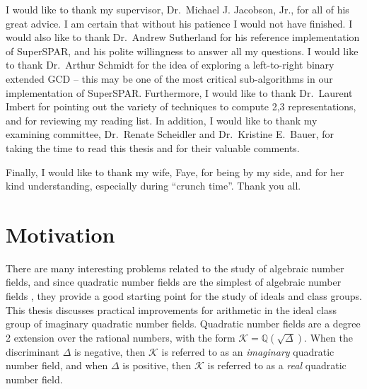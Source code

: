 \documentclass{ucalgthes1}
\theoremstyle{definition}
\newcommand{\QQ}{\mathbb{Q}}
\newcommand{\KK}{\mathcal{K}}
\begin{document}
\newpage
{}
{}

I would like to thank my supervisor, Dr.\ Michael J. Jacobson, Jr., for all of his great advice.  I am certain that without his patience I would not have finished.  I would also like to thank Dr.\ Andrew Sutherland for his reference implementation of SuperSPAR, and his polite willingness to answer all my questions.  I would like to thank Dr.\ Arthur Schmidt for the idea of exploring a left-to-right binary extended GCD -- this may be one of the most critical sub-algorithms in our implementation of SuperSPAR.  Furthermore, I would like to thank Dr.\ Laurent Imbert for pointing out the variety of techniques to compute 2,3 representations, and for reviewing my reading list.  In addition, I would like to thank my examining committee, Dr.\ Renate Scheidler and Dr.\ Kristine E.\ Bauer, for taking the time to read this thesis and for their valuable comments.

Finally, I would like to thank my wife, Faye, for being by my side, and for her kind understanding, especially during ``crunch time''.  Thank you all.

\begin{singlespace}
\newpage
{}
\tableofcontents
\pagestyle{plain}
\newpage
{}
\listoftables
\pagestyle{plain}
\newpage
{}
\listoffigures
\pagestyle{plain}
\newpage
{}
\listofalgorithms
\pagestyle{plain}
\clearpage
\clearpage          %
\end{singlespace}




\chapter{Motivation}

There are many interesting problems related to the study of algebraic number fields, and since quadratic number fields are the simplest of algebraic number fields \cite[p.77]{Jacobson2009}, they provide a good starting point for the study of ideals and class groups.  This thesis discusses practical improvements for arithmetic in the ideal class group of imaginary quadratic number fields.  Quadratic number fields are a degree 2 extension over the rational numbers, with the form $\KK = \QQ(\sqrt\Delta)$.  When the discriminant $\Delta$ is negative, then $\KK$ is referred to as an \emph{imaginary} quadratic number field, and when $\Delta$ is positive, then $\KK$ is referred to as a \emph{real} quadratic number field.
\end{document}

